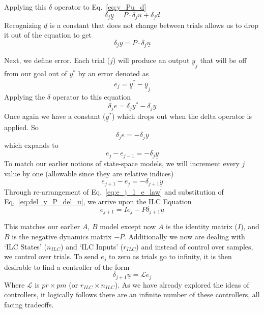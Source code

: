 Applying this $\delta$ operator to Eq.~\ref{eq:y_Pu_d}
\begin{equation}
    \delta_j\underline{y}=P\cdot\delta_j\underline{u}+\delta_j\underline{d}
    \label{eq:del_P_with_d}
\end{equation}
Recognizing $\underline{d}$ is a constant that does not change between trials allows us to drop it out of the equation to get
\begin{equation}
    \delta_j\underline{y}=P\cdot\delta_j\underline{u}
    \label{eq:del_y_P_del_u}
\end{equation}

Next, we define error. Each trial ($j$) will produce an output ${\underline{y}}_j$ that will be off from our goal out of ${\underline{y}}^\ast$ by an error denoted as
\begin{equation}
    e_j={\underline{y}}^\ast-{\underline{y}}_j
    \label{eq:e_j_def}
\end{equation}
Applying the $\delta$ operator to this equation
\begin{equation}
    \delta_j e=\delta_j{\underline{y}}^\ast-\delta_j\underline{y}
    \label{eq:del_e_law_w_star}
\end{equation}
Once again we have a constant (${\underline{y}}^\ast$) which drops out when the delta operator is applied. So 
\begin{equation}
    \delta_j e =-\delta_j \underline{y}
    \label{del_e_law}
\end{equation}
which expands to
\begin{equation}
    e_j-e_{j-1}=-\delta_j\underline{y}
    \label{e_j_e_j_1_law}
\end{equation}
To match our earlier notions of state-space models, we will increment every $j$ value by one (allowable since they are relative indices)
\begin{equation}
    e_{j+1}-e_j=-\delta_{j+1}\underline{y}
    \label{eq:e_j_1_e_law}
\end{equation}
Through re-arrangement of Eq.~\ref{eq:e_j_1_e_law} and substitution of Eq,~\ref{eq:del_y_P_del_u}, we arrive upon the ILC Equation
\begin{equation}
    e_{j+1}=Ie_j-P\delta_{j+1}\underline{u}
    \label{eq:ILC_law}
\end{equation}

This matches our earlier $A$, $B$ model except now $A$ is the identity matrix ($I$), and $B$ is the negative dynamics matrix $-P$. Additionally we now are dealing with `ILC States' ($n_{ILC}$) and `ILC Inputs' ($r_{ILC}$) and instead of control over samples, we control over trials. To send $e_j$ to zero as trials go to infinity, it is then desirable to find a controller of the form
\begin{equation}
    \delta_{j+1}\underline{u}=\mathcal{L}e_j
    \label{eq:del_u_L_e_j}
\end{equation}
Where $\mathcal{L}$ is $pr\times pm$ (or $r_{ILC} \times n_{ILC}$). As we have already explored the ideas of controllers, it logically follows there are an infinite number of these controllers, all facing tradeoffs. 

